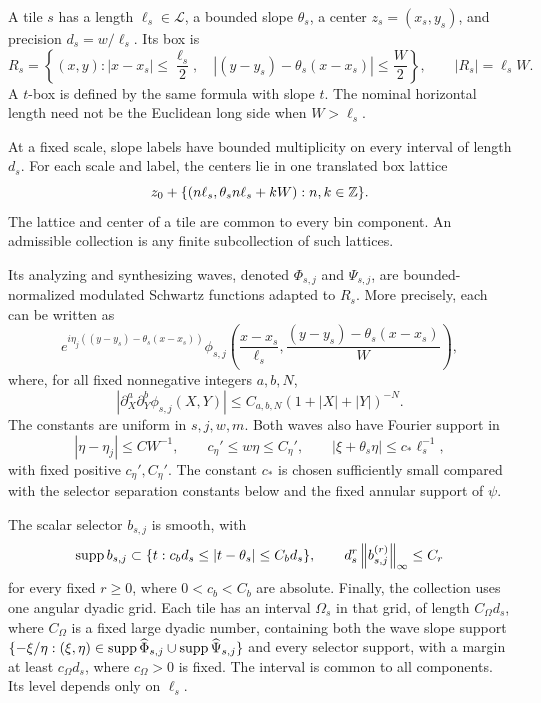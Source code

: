 \begin{definition}\label{red:packets}
A tile \(s\) has a length \(\ell_s\in\mathcal L\), a bounded
slope \(\theta_s\), a center \(z_s=(x_s,y_s)\), and precision
\(d_s=w/\ell_s\). Its box is
\[
 R_s=\left\{(x,y): |x-x_s|\le\frac{\ell_s}{2},\quad
       |(y-y_s)-\theta_s(x-x_s)|\le\frac W2\right\},
 \qquad |R_s|=\ell_s W.
\]
A \(t\)-box is defined by the same formula with slope \(t\).
The nominal horizontal length need not be the Euclidean long side
when \(W>\ell_s\).

At a fixed scale, slope labels have bounded multiplicity on every
interval of length \(d_s\). For each scale and label, the centers
lie in one translated box lattice
\[
 z_0+\{(n\ell_s,\theta_s n\ell_s+kW):n,k\in\mathbb Z\}.
\]
The lattice and center of a tile are common to every bin component.
An admissible collection is any finite subcollection of such lattices.

Its analyzing and synthesizing waves, denoted
\(\Phi_{s,j}\) and \(\Psi_{s,j}\), are bounded-normalized
modulated Schwartz functions adapted to \(R_s\). More precisely,
each can be written as
\[
 e^{i\eta_j((y-y_s)-\theta_s(x-x_s))}
 \phi_{s,j}\left(
       \frac{x-x_s}{\ell_s},
       \frac{(y-y_s)-\theta_s(x-x_s)}{W}\right),
\]
where, for all fixed nonnegative integers \(a,b,N\),
\begin{equation}\label{red:packet-seminorms}
 |\partial_X^a\partial_Y^b\phi_{s,j}(X,Y)|
       \le C_{a,b,N}(1+|X|+|Y|)^{-N}.
\end{equation}
The constants are uniform in \(s,j,w,m\). Both waves also have
Fourier support in
\begin{equation}\label{red:packet-spectra}
 |\eta-\eta_j|\le C W^{-1},\qquad
 c_\eta'\le w\eta\le C_\eta',\qquad
 |\xi+\theta_s\eta|\le c_*\ell_s^{-1},
\end{equation}
with fixed positive \(c_\eta',C_\eta'\). The constant \(c_*\)
is chosen sufficiently small compared with the selector separation
constants below and the fixed annular support of \(\psi\).

The scalar selector \(b_{s,j}\) is smooth, with
\begin{equation}\label{red:selector-assumptions}
 \operatorname{supp} b_{s,j}\subset
    \{t:c_b d_s\le|t-\theta_s|\le C_b d_s\},
 \qquad d_s^r\left\|b_{s,j}^{(r)}\right\|_\infty\le C_r
\end{equation}
for every fixed \(r\ge0\), where \(0<c_b<C_b\) are absolute.
Finally, the collection uses one angular dyadic grid. Each tile has
an interval \(\Omega_s\) in that grid, of length
\(C_\Omega d_s\), where \(C_\Omega\) is a fixed large dyadic
number, containing both the wave slope support
\(\{-\xi/\eta:(\xi,\eta)\in\operatorname{supp}\widehat\Phi_{s,j}
\cup\operatorname{supp}\widehat\Psi_{s,j}\}\) and every selector support, with
a margin at least \(c_\Omega d_s\), where \(c_\Omega>0\) is fixed.
The interval is common to all components. Its level depends only on
\(\ell_s\).
\end{definition}

